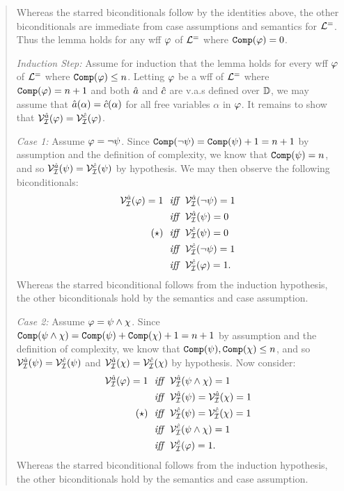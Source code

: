 \begin{quote}
  Whereas the starred biconditionals follow by the identities above, the other biconditionals are immediate from case assumptions and semantics for $\mathcal{L}^{=}$.
  Thus the lemma holds for any wff $\varphi$ of $\mathcal{L}^{=}$ where $\texttt{Comp}(\varphi) = 0$.

  \textit{Induction Step:}
  Assume for induction that the lemma holds for every wff $\varphi$ of $\mathcal{L}^{=}$ where $\texttt{Comp}(\varphi) \leq n$.
  Letting $\varphi$ be a wff of $\mathcal{L}^{=}$ where $\texttt{Comp}(\varphi) = n + 1$ and both $\hat{a}$ and $\hat{c}$ are v.a.s defined over $\mathbb{D}$, we may assume that $\hat{a}(\alpha)=\hat{c}(\alpha)$ for all free variables $\alpha$ in $\varphi$. 
  It remains to show that $\mathcal{V}_{\mathcal{I}}^{\hat{a}}(\varphi)=\mathcal{V}_{\mathcal{I}}^{\hat{c}}(\varphi)$.

  \textit{Case 1:}
  Assume $\varphi = \neg \psi$.
  Since $\texttt{Comp}(\neg \psi) = \texttt{Comp}(\psi) + 1 = n + 1$ by assumption and the definition of complexity, we know that $\texttt{Comp}(\psi) = n$, and so $\mathcal{V}_{\mathcal{I}}^{\hat{a}}(\psi)=\mathcal{V}_{\mathcal{I}}^{\hat{c}}(\psi)$ by hypothesis.
  We may then observe the following biconditionals:
  \begin{align*}
    \mathcal{V}_{\mathcal{I}}^{\hat{a}}(\varphi) = 1
      ~~\textit{iff}~~  & \mathcal{V}_{\mathcal{I}}^{\hat{a}}(\neg \psi) = 1\\
      ~~\textit{iff}~~  & \mathcal{V}_{\mathcal{I}}^{\hat{a}}(\psi) = 0\\
      (\star) ~~\textit{iff}~~  & \mathcal{V}_{\mathcal{I}}^{\hat{c}}(\psi) = 0\\
      ~~\textit{iff}~~  & \mathcal{V}_{\mathcal{I}}^{\hat{c}}(\neg \psi) = 1\\
      ~~\textit{iff}~~  & \mathcal{V}_{\mathcal{I}}^{\hat{c}}(\varphi) = 1.
  \end{align*}
  Whereas the starred biconditional follows from the induction hypothesis, the other biconditionals hold by the semantics and case assumption.

  \textit{Case 2:}
  Assume $\varphi = \psi \wedge \chi$.
  Since $\texttt{Comp}(\psi \wedge \chi) = \texttt{Comp}(\psi) + \texttt{Comp}(\chi) + 1 = n + 1$ by assumption and the definition of complexity, we know that $\texttt{Comp}(\psi), \texttt{Comp}(\chi) \leq n$, and so $\mathcal{V}_{\mathcal{I}}^{\hat{a}}(\psi)=\mathcal{V}_{\mathcal{I}}^{\hat{c}}(\psi)$ and $\mathcal{V}_{\mathcal{I}}^{\hat{a}}(\chi)=\mathcal{V}_{\mathcal{I}}^{\hat{c}}(\chi)$ by hypothesis.
  Now consider:
  \begin{align*}
    \mathcal{V}_{\mathcal{I}}^{\hat{a}}(\varphi) = 1
      ~~\textit{iff}~~  & \mathcal{V}_{\mathcal{I}}^{\hat{a}}(\psi \wedge \chi) = 1\\
      ~~\textit{iff}~~  & \mathcal{V}_{\mathcal{I}}^{\hat{a}}(\psi) = \mathcal{V}_{\mathcal{I}}^{\hat{a}}(\chi) = 1\\
      (\star) ~~\textit{iff}~~  & \mathcal{V}_{\mathcal{I}}^{\hat{c}}(\psi) = \mathcal{V}_{\mathcal{I}}^{\hat{c}}(\chi) = 1\\
      ~~\textit{iff}~~  & \mathcal{V}_{\mathcal{I}}^{\hat{c}}(\psi \wedge \chi) = 1\\
      ~~\textit{iff}~~  & \mathcal{V}_{\mathcal{I}}^{\hat{c}}(\varphi) = 1.
  \end{align*}
  Whereas the starred biconditional follows from the induction hypothesis, the other biconditionals hold by the semantics and case assumption.


\end{quote}

